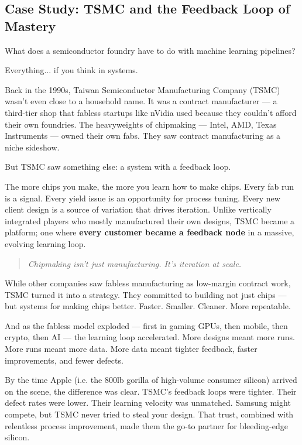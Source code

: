 \subsection{Case Study: TSMC and the Feedback Loop of Mastery}

What does a semiconductor foundry have to do with machine learning pipelines?

Everything... if you think in systems.

Back in the 1990s, Taiwan Semiconductor Manufacturing Company (TSMC) wasn’t even close to a household name. It was a contract manufacturer — a third-tier shop that fabless startups like nVidia used because they couldn’t afford their own foundries. The heavyweights of chipmaking — Intel, AMD, Texas Instruments — owned their own fabs. They saw contract manufacturing as a niche sideshow.

But TSMC saw something else: a system with a feedback loop.

The more chips you make, the more you learn how to make chips. Every fab run is a signal. Every yield issue is an opportunity for process tuning. Every new client design is a source of variation that drives iteration. Unlike vertically integrated players who mostly manufactured their own designs, TSMC became a platform; one where \textbf{every customer became a feedback node} in a massive, evolving learning loop.

\begin{quote}
\textit{Chipmaking isn’t just manufacturing. It’s iteration at scale.}
\end{quote}

While other companies saw fabless manufacturing as low-margin contract work, TSMC turned it into a strategy. They committed to building not just chips — but systems for making chips better. Faster. Smaller. Cleaner. More repeatable.

And as the fabless model exploded — first in gaming GPUs, then mobile, then crypto, then AI — the learning loop accelerated. More designs meant more runs. More runs meant more data. More data meant tighter feedback, faster improvements, and fewer defects.

By the time Apple (i.e. the 800lb gorilla of high-volume consumer silicon) arrived on the scene, the difference was clear. TSMC’s feedback loops were tighter. Their defect rates were lower. Their learning velocity was unmatched. Samsung might compete, but TSMC never tried to steal your design. That trust, combined with relentless process improvement, made them the go-to partner for bleeding-edge silicon.

